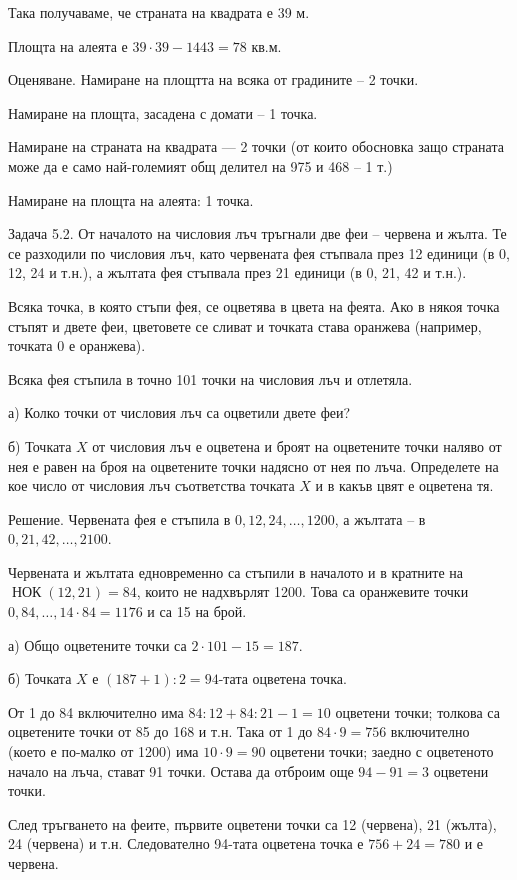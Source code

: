 Така получаваме, че страната на квадрата е 39 м.

Площта на алеята е $39\cdot39-1443=78$ кв.м.

Оценяване. Намиране на площтта на всяка от градините – 2 точки.

Намиране на площта, засадена с домати – 1 точка.

Намиране на страната на квадрата — 2 точки (от които обосновка защо страната може да е само най-големият общ делител на 975 и 468 – 1 т.)

Намиране на площта на алеята: 1 точка.

Задача 5.2. От началото на числовия лъч тръгнали две феи – червена и жълта. Те се разходили по числовия лъч, като червената фея стъпвала през 12 единици (в 0, 12, 24 и т.н.), а жълтата фея стъпвала през 21 единици (в 0, 21, 42 и т.н.).

Всяка точка, в която стъпи фея, се оцветява в цвета на феята. Ако в някоя точка стъпят и двете феи, цветовете се сливат и точката става оранжева (например, точката 0 е оранжева).

Всяка фея стъпила в точно 101 точки на числовия лъч и отлетяла.

а) Колко точки от числовия лъч са оцветили двете феи?

б) Точката $X$ от числовия лъч е оцветена и броят на оцветените точки наляво от нея е равен на броя на оцветените точки надясно от нея по лъча. Определете на кое число от числовия лъч съответства точката $X$ и в какъв цвят е оцветена тя.

Решение. Червената фея е стъпила в $0,12,24,\ldots,1200$, а жълтата – в $0,21,42,\ldots,2100$.

Червената и жълтата едновременно са стъпили в началото и в кратните на $\operatorname{НОК}(12,21)=84$, които не надхвърлят 1200. Това са оранжевите точки $0,84,\ldots,14\cdot84=1176$ и са 15 на брой.

а) Общо оцветените точки са $2\cdot101-15=187$.

б) Точката $X$ е $(187+1):2=94$-тата оцветена точка.

От 1 до 84 включително има $84:12+84:21-1=10$ оцветени точки; толкова са оцветените точки от 85 до 168 и т.н. Така от 1 до $84\cdot9=756$ включително (което е по-малко от 1200) има $10\cdot9=90$ оцветени точки; заедно с оцветеното начало на лъча, стават 91 точки. Остава да отброим още $94-91=3$ оцветени точки.

След тръгването на феите, първите оцветени точки са 12 (червена), 21 (жълта), 24 (червена) и т.н. Следователно 94-тата оцветена точка е $756+24=780$ и е червена.

